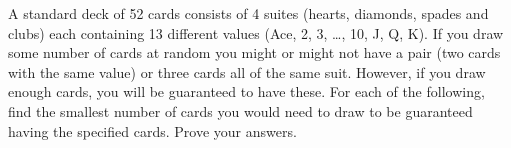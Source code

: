 \begin{questions}
\question A standard deck of 52 cards consists of 4 suites (hearts, diamonds, spades and clubs) each containing 13 different values (Ace, 2, 3, \ldots, 10, J, Q, K).  If you draw some number of cards at random you might or might not have a pair (two cards with the same value) or three cards all of the same suit.  However, if you draw enough cards, you will be guaranteed to have these.  For each of the following, find the smallest number of cards you would need to draw to be guaranteed having the specified cards.  Prove your answers.




\end{questions}
